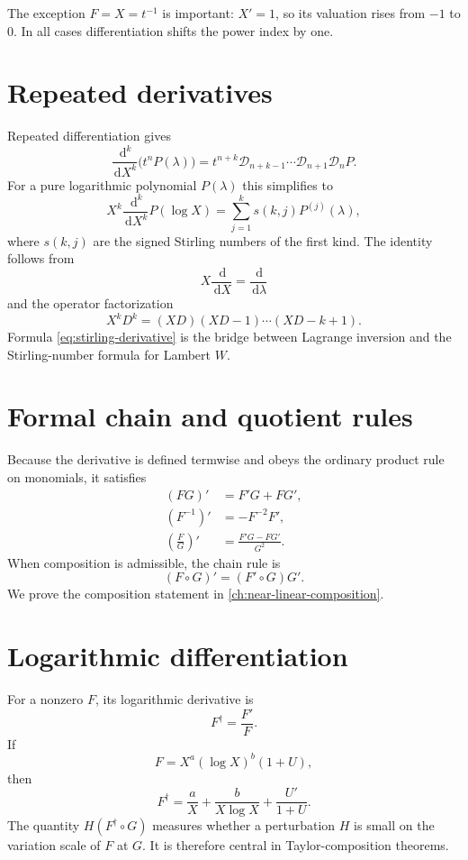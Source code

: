 \documentclass[11pt,openany]{book}
\theoremstyle{definition}
\theoremstyle{plain}
\theoremstyle{remark}
\newcommand{\dd}{\,\mathrm{d}}
\begin{document}
The exception \(F=X=t^{-1}\) is important: \(X'=1\), so its valuation rises from \(-1\) to \(0\). In all cases differentiation shifts the power index by one.

\section{Repeated derivatives}
Repeated differentiation gives
\begin{equation}\label{eq:repeated-derivative-block}
 \frac{\dd^k}{\dd X^k}\bigl(t^nP(\lambda)\bigr)
 =t^{n+k}
 \mathcal D_{n+k-1}\cdots\mathcal D_{n+1}\mathcal D_nP.
\end{equation}
For a pure logarithmic polynomial \(P(\lambda)\) this simplifies to
\begin{equation}\label{eq:stirling-derivative}
 X^k\frac{\dd^k}{\dd X^k}P(\log X)
 =\sum_{j=1}^{k}s(k,j)P^{(j)}(\lambda),
\end{equation}
where \(s(k,j)\) are the signed Stirling numbers of the first kind. The identity follows from
\[
 X\frac{\dd}{\dd X}=\frac{\dd}{\dd\lambda}
\]
and the operator factorization
\[
 X^kD^k=(XD)(XD-1)\cdots(XD-k+1).
\]
Formula \cref{eq:stirling-derivative} is the bridge between Lagrange inversion and the Stirling-number formula for Lambert \(W\).

\section{Formal chain and quotient rules}
Because the derivative is defined termwise and obeys the ordinary product rule on monomials, it satisfies
\begin{align*}
 (FG)'&=F'G+FG',\\
 (F^{-1})'&=-F^{-2}F',\\
 \left(\frac FG\right)'&=\frac{F'G-FG'}{G^2}.
\end{align*}
When composition is admissible, the chain rule is
\begin{equation}\label{eq:chain-rule-preview}
 (F\circ G)'=(F'\circ G)G'.
\end{equation}
We prove the composition statement in \cref{ch:near-linear-composition}.

\section{Logarithmic differentiation}
For a nonzero \(F\), its logarithmic derivative is
\[
 F^\dagger=\frac{F'}F.
\]
If
\[
 F=X^a(\log X)^b(1+U),
\]
then
\begin{equation}\label{eq:logarithmic-derivative}
 F^\dagger=\frac aX+\frac b{X\log X}+\frac{U'}{1+U}.
\end{equation}
The quantity \(H(F^\dagger\circ G)\) measures whether a perturbation \(H\) is small on the variation scale of \(F\) at \(G\). It is therefore central in Taylor-composition theorems.
\end{document}

